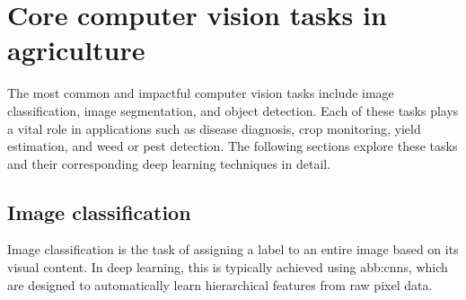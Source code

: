     
    

\section{Core computer vision tasks in agriculture}

The most common and impactful computer vision tasks include image classification, image segmentation, and object detection. Each of these tasks plays a vital role in applications such as disease diagnosis, crop monitoring, yield estimation, and weed or pest detection. The following sections explore these tasks and their corresponding deep learning techniques in detail.
\subsection{Image classification}
Image classification is the task of assigning a label to an entire image based on its visual content. In deep learning, this is typically achieved using \gls{abb:cnn}s, which are designed to automatically learn hierarchical features from raw pixel data.

